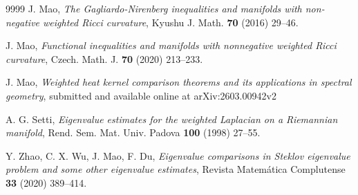 \documentclass[12pt]{article}
\begin{document}
\begin{thebibliography}{9999}
 J. Mao, \emph{The Gagliardo-Nirenberg inequalities and manifolds with non-negative weighted Ricci
curvature}, Kyushu J. Math.  {\bf 70} (2016) 29--46.


 J. Mao, \emph{Functional inequalities and manifolds with nonnegative weighted Ricci
curvature}, Czech. Math. J. {\bf 70} (2020) 213--233.



 J. Mao, \emph{Weighted heat kernel comparison theorems and its
applications in spectral geometry}, submitted and available online
at arXiv:2603.00942v2

 A. G. Setti, \emph{Eigenvalue estimates for the weighted Laplacian on a
Riemannian manifold}, Rend. Sem. Mat. Univ. Padova {\bf 100} (1998)
27--55.


 Y. Zhao, C. X. Wu, J. Mao, F. Du, \emph{Eigenvalue comparisons in Steklov eigenvalue problem
and some other eigenvalue estimates}, Revista Matem\'{a}tica
Complutense {\bf 33} (2020) 389--414.






\end{thebibliography}
\end{document}
